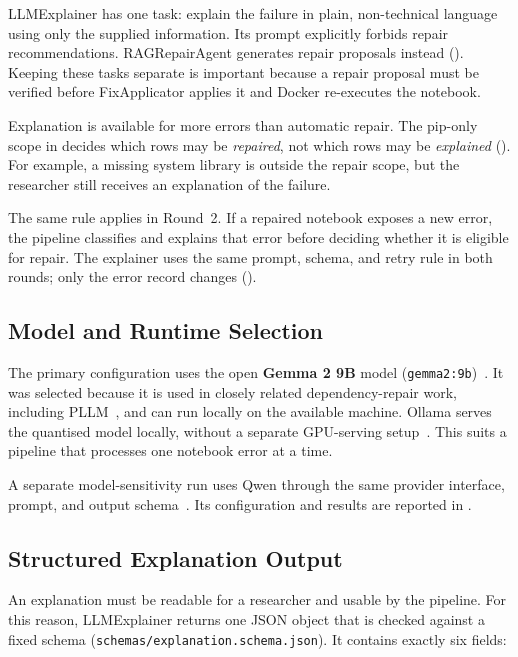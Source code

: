 LLMExplainer has one task: explain the failure in plain, non-technical
language using only the supplied information. Its prompt explicitly forbids
repair recommendations. RAGRepairAgent generates repair proposals instead
(). Keeping these tasks separate is important because a
repair proposal must be verified before FixApplicator applies it and Docker
re-executes the notebook.

Explanation is available for more errors than automatic repair. The pip-only
scope in  decides which rows may be \emph{repaired}, not
which rows may be \emph{explained} (). For
example, a missing system library is outside the repair scope, but the
researcher still receives an explanation of the failure.

The same rule applies in Round~2. If a repaired notebook exposes a new error,
the pipeline classifies and explains that error before deciding whether it is
eligible for repair. The explainer uses the same prompt, schema, and retry
rule in both rounds; only the error record changes
().

\subsection{Model and Runtime Selection}

The primary configuration uses the open \textbf{Gemma 2 9B} model
(\texttt{gemma2:9b})~\cite{gemmateam2024}. It was selected because it is used in closely related
dependency-repair work, including PLLM~\cite{bartlett2025pllm}, and can run
locally on the available machine. Ollama serves the quantised model locally,
without a separate GPU-serving setup~\cite{ollama}. This suits a pipeline that processes
one notebook error at a time.

A separate model-sensitivity run uses Qwen through the same provider interface,
prompt, and output schema~\cite{qwenteam2025}. Its configuration and results are reported in
.

\subsection{Structured Explanation Output}
\label{sec:m-explanation-deviation}

An explanation must be readable for a researcher and usable by the pipeline.
For this reason, LLMExplainer returns one JSON object that is checked against
a fixed schema (\texttt{schemas/}\allowbreak\texttt{explanation.schema.json}).
It contains exactly six fields:

